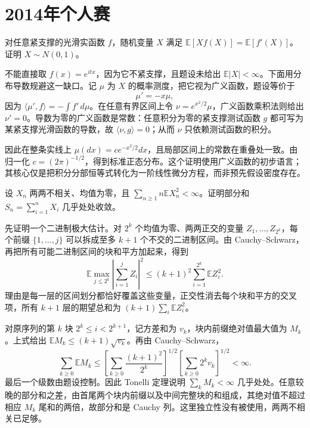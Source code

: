 \documentclass[UTF8,12pt,a4paper,fontset=fandol]{ctexbook}
\newcommand{\E}{\mathbb E}
\begin{document}
\section{2014年个人赛}
\begin{example}[原题1：正态分布的积分恒等式刻画]\label{yau:2014-1}
对任意紧支撑的光滑实函数 $f$，随机变量 $X$ 满足 $\E[Xf(X)]=\E[f'(X)]$。证明 $X\sim N(0,1)$。
\end{example}
\begin{solve}
不能直接取 $f(x)=e^{itx}$，因为它不紧支撑，且题设未给出 $\E|X|<\infty$。下面用分布导数规避这一缺口。记 $\mu$ 为 $X$ 的概率测度，把它视为广义函数，题设等价于
\[
\mu'=-x\mu,
\]
因为 $\langle\mu',f\rangle=-\int f'\,d\mu$。在任意有界区间上令 $\nu=e^{x^2/2}\mu$，广义函数乘积法则给出 $\nu'=0$。导数为零的广义函数是常数：任意积分为零的紧支撑测试函数 $g$ 都可写为某紧支撑光滑函数的导数，故 $\langle\nu,g\rangle=0$；从而 $\nu$ 只依赖测试函数的积分。

因此在整条实线上 $\mu(dx)=c e^{-x^2/2}dx$，且局部区间上的常数在重叠处一致。由归一化 $c=(2\pi)^{-1/2}$，得到标准正态分布。这个证明使用广义函数的初步语言；其核心仅是把积分分部恒等式转化为一阶线性微分方程，而非预先假设密度存在。
\end{solve}

\begin{example}[原题2：正交随机级数的一个充分条件]\label{yau:2014-2}
设 $X_n$ 两两不相关、均值为零，且 $\sum_{n\ge1}n\E X_n^2<\infty$。证明部分和 $S_n=\sum_{i=1}^nX_i$ 几乎处处收敛。
\end{example}
\begin{solve}
先证明一个二进制极大估计。对 $2^k$ 个均值为零、两两正交的变量 $Z_1,\ldots,Z_{2^k}$，每个前缀 $\{1,\ldots,j\}$ 可以拆成至多 $k+1$ 个不交的二进制区间。由 Cauchy--Schwarz，再把所有可能二进制区间的块和平方加起来，得到
\[
\E\max_{j\le2^k}\left|\sum_{i=1}^j Z_i\right|^2\le(k+1)^2\sum_{i=1}^{2^k}\E Z_i^2.
\]
理由是每一层的区间划分都恰好覆盖这些变量，正交性消去每个块和平方的交叉项，所有 $k+1$ 层的期望总和为 $(k+1)\sum_i\E Z_i^2$。

对原序列的第 $k$ 块 $2^k\le i<2^{k+1}$，记方差和为 $v_k$，块内前缀绝对值最大值为 $M_k$。上式给出 $\E M_k\le(k+1)\sqrt{v_k}$。再由 Cauchy--Schwarz，
\[
\sum_{k\ge0}\E M_k\le
\left[\sum_{k\ge0}\frac{(k+1)^2}{2^k}\right]^{1/2}
\left[\sum_{k\ge0}2^kv_k\right]^{1/2}<\infty.
\]
最后一个级数由题设控制。因此 Tonelli 定理说明 $\sum_kM_k<\infty$ 几乎处处。任意较晚的部分和之差，由首尾两个块内前缀以及中间完整块的和组成，其绝对值不超过相应 $M_k$ 尾和的两倍，故部分和是 Cauchy 列。这里独立性没有被使用，两两不相关已足够。
\end{solve}
\end{document}
